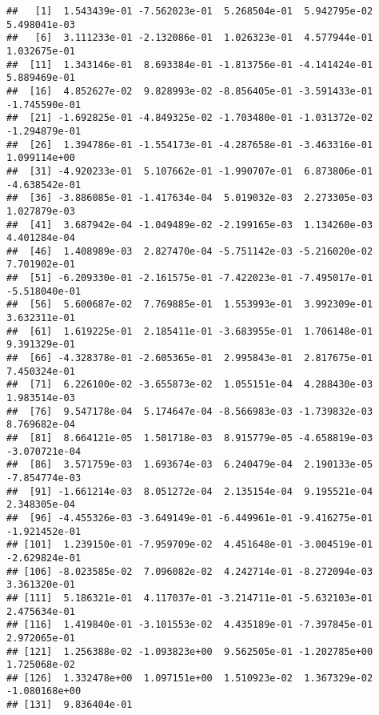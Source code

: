 \documentclass[
]{article}
\newenvironment{Shaded}{\begin{snugshade}}{\end{snugshade}}
\newcommand{\NormalTok}[1]{#1}
\newcommand{\OperatorTok}[1]{\textcolor[rgb]{0.81,0.36,0.00}{\textbf{#1}}}
\begin{document}
\begin{verbatim}
##   [1]  1.543439e-01 -7.562023e-01  5.268504e-01  5.942795e-02  5.498041e-03
##   [6]  3.111233e-01 -2.132086e-01  1.026323e-01  4.577944e-01  1.032675e-01
##  [11]  1.343146e-01  8.693384e-01 -1.813756e-01 -4.141424e-01  5.889469e-01
##  [16]  4.852627e-02  9.828993e-02 -8.856405e-01 -3.591433e-01 -1.745590e-01
##  [21] -1.692825e-01 -4.849325e-02 -1.703480e-01 -1.031372e-02 -1.294879e-01
##  [26]  1.394786e-01 -1.554173e-01 -4.287658e-01 -3.463316e-01  1.099114e+00
##  [31] -4.920233e-01  5.107662e-01 -1.990707e-01  6.873806e-01 -4.638542e-01
##  [36] -3.886085e-01 -1.417634e-04  5.019032e-03  2.273305e-03  1.027879e-03
##  [41]  3.687942e-04 -1.049489e-02 -2.199165e-03  1.134260e-03  4.401284e-04
##  [46]  1.408989e-03  2.827470e-04 -5.751142e-03 -5.216020e-02  7.701902e-01
##  [51] -6.209330e-01 -2.161575e-01 -7.422023e-01 -7.495017e-01 -5.518040e-01
##  [56]  5.600687e-02  7.769885e-01  1.553993e-01  3.992309e-01  3.632311e-01
##  [61]  1.619225e-01  2.185411e-01 -3.683955e-01  1.706148e-01  9.391329e-01
##  [66] -4.328378e-01 -2.605365e-01  2.995843e-01  2.817675e-01  7.450324e-01
##  [71]  6.226100e-02 -3.655873e-02  1.055151e-04  4.288430e-03  1.983514e-03
##  [76]  9.547178e-04  5.174647e-04 -8.566983e-03 -1.739832e-03  8.769682e-04
##  [81]  8.664121e-05  1.501718e-03  8.915779e-05 -4.658819e-03 -3.070721e-04
##  [86]  3.571759e-03  1.693674e-03  6.240479e-04  2.190133e-05 -7.854774e-03
##  [91] -1.661214e-03  8.051272e-04  2.135154e-04  9.195521e-04  2.348305e-04
##  [96] -4.455326e-03 -3.649149e-01 -6.449961e-01 -9.416275e-01 -1.921452e-01
## [101]  1.239150e-01 -7.959709e-02  4.451648e-01 -3.004519e-01 -2.629824e-01
## [106] -8.023585e-02  7.096082e-02  4.242714e-01 -8.272094e-03  3.361320e-01
## [111]  5.186321e-01  4.117037e-01 -3.214711e-01 -5.632103e-01  2.475634e-01
## [116]  1.419840e-01 -3.101553e-02  4.435189e-01 -7.397845e-01  2.972065e-01
## [121]  1.256388e-02 -1.093823e+00  9.562505e-01 -1.202785e+00  1.725068e-02
## [126]  1.332478e+00  1.097151e+00  1.510923e-02  1.367329e-02 -1.080168e+00
## [131]  9.836404e-01
\end{verbatim}

\begin{Shaded}
\end{Shaded}
\end{document}
